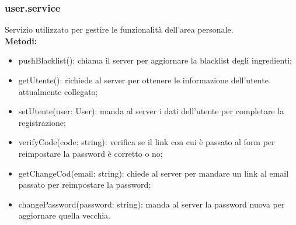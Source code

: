 \subsubsection{user.service}
Servizio utilizzato per gestire le funzionalità dell'area personale.\\
\textbf{Metodi:}
\begin{itemize}
    \item pushBlacklist(): chiama il server per aggiornare la blacklist degli ingredienti;
    \item getUtente(): richiede al server per ottenere le informazione dell'utente attualmente collegato;
    \item setUtente(user: User): manda al server i dati dell'utente per completare la registrazione;
    \item verifyCode(code: string): verifica se il link con cui è passato al form per reimpostare la password è corretto o no;
    \item getChangeCod(email: string): chiede al server per mandare un link al email passato per reimpostare la password;
    \item changePassword(password: string): manda al server la password nuova per aggiornare quella vecchia.
\end{itemize}